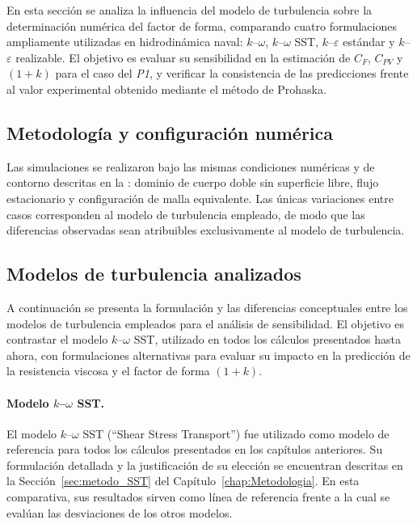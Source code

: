En esta sección se analiza la influencia del modelo de turbulencia sobre la 
determinación numérica del factor de forma, comparando cuatro formulaciones 
ampliamente utilizadas en hidrodinámica naval: $k$--$\omega$, $k$--$\omega$ SST, 
$k$--$\varepsilon$ estándar y $k$--$\varepsilon$ realizable. El objetivo es 
evaluar su sensibilidad en la estimación de $C_F$, $C_{PV}$ y $(1+k)$ para el 
caso del \textit{P1}, y verificar la consistencia de las predicciones frente al 
valor experimental obtenido mediante el método de Prohaska.

\subsection{Metodología y configuración numérica}

Las simulaciones se realizaron bajo las mismas condiciones numéricas y de 
contorno descritas en la : dominio de cuerpo 
doble sin superficie libre, flujo estacionario y configuración de malla 
equivalente. Las únicas variaciones entre casos corresponden al modelo de 
turbulencia empleado, de modo que las diferencias observadas sean atribuibles 
exclusivamente al modelo de turbulencia.

\subsection{Modelos de turbulencia analizados}

A continuación se presenta la formulación y las diferencias conceptuales entre 
los modelos de turbulencia empleados para el análisis de sensibilidad. El 
objetivo es contrastar el modelo $k$--$\omega$ SST, utilizado en todos los 
cálculos presentados hasta ahora, con formulaciones alternativas para evaluar 
su impacto en la predicción de la resistencia viscosa y el factor de forma 
$(1+k)$.

\paragraph{Modelo $k$--$\omega$ SST.}

El modelo $k$--$\omega$ SST (``Shear Stress Transport'') fue utilizado 
como modelo de referencia para todos los cálculos presentados en los capítulos 
anteriores. Su formulación detallada y la justificación de su elección se 
encuentran descritas en la Sección~\ref{sec:metodo_SST} del 
Capítulo~\ref{chap:Metodologia}. En esta comparativa, sus resultados sirven 
como línea de referencia frente a la cual se evalúan las desviaciones de los 
otros modelos.

